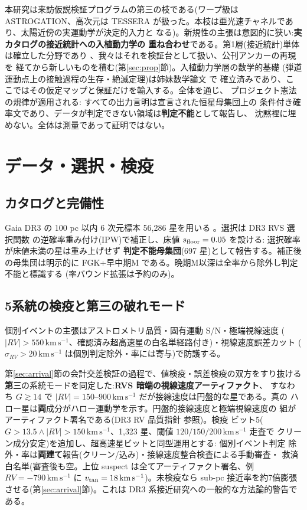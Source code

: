 \documentclass[11pt]{article}
\newcommand{\kms}{\,\mathrm{km\,s^{-1}}}
\begin{document}
本研究は来訪仮説検証プログラムの第三の枝である(ワープ級は ASTROGATION、高次元は
TESSERA が扱った。本枝は亜光速チャネルであり、太陽近傍の実運動学が決定的入力と
なる)。新規性の主張は意図的に狭い:\textbf{実カタログの接近統計への入植動力学の
重ね合わせ}である。第1層(接近統計)単体は確立した分野であり
\cite{bj18,bj22,gs01,fp26}、我々はそれを検証台として扱い、公刊アンカーの再現を
経てから新しいものを積む(第\ref{sec:prop}節)。入植動力学層の数学的基礎
(弾道運動点上の接触過程の生存・絶滅定理)は姉妹数学論文 \cite{wakemath} で
確立済みであり、ここではその仮定マップと保証だけを輸入する。全体を通じ、
プロジェクト憲法の規律が適用される: すべての出力言明は宣言された恒星母集団上の
条件付き確率文であり、データが判定できない領域は\textbf{判定不能}として報告し、
沈黙裡に埋めない。全体は測量であって証明ではない。

\section{データ・選択・検疫}\label{sec:data}

\subsection{カタログと完備性}
Gaia DR3 の 100 pc 以内 6 次元標本 56{,}286 星を用いる \cite{gaiadr3}。選択は
DR3 RVS 選択関数 \cite{gaiaunlimited} の逆確率重み付け(IPW)で補正し、床値
$s_{\rm floor}=0.05$ を設ける: 選択確率が床値未満の星は重み上げせず
\textbf{判定不能母集団}(697 星)として報告する。補正後の母集団は明示的に
FGK+早中期M である。晩期M以深は全率から除外し判定不能と標識する
(率バウンド拡張は予約のみ)。

\subsection{5系統の検疫と第三の破れモード}\label{sec:bit5}
個別イベントの主張はアストロメトリ品質・固有運動 S/N・極端視線速度
($|RV|>550\kms$、確認済み超高速星の白名単経路付き)・視線速度誤差カット
($\sigma_{RV}>20\kms$ は個別判定除外・率には寄与)で防護する。

第\ref{sec:arrival}節の会計交差検証の過程で、値検疫・誤差検疫の双方をすり抜ける
\textbf{第三}の系統モードを同定した:\textbf{RVS 暗端の視線速度アーティファクト}、
すなわち $G\gtrsim14$ で $|RV|=150$--$900\kms$ だが接線速度は円盤的な星である。真の
ハロー星は\textbf{両}成分がハロー運動学を示す。円盤的接線速度と極端視線速度の
組がアーティファクト署名である(DR3 RV 品質指針 \cite{katz23} 参照)。検疫
ビット5($G>13.5\wedge|RV|>150\kms$、1{,}323 星、閾値 $120/150/200\kms$ 走査で
クリーン成分安定)を追加し、超高速星ビットと同型運用とする: 個別イベント判定
除外・率は\textbf{両建て}報告(クリーン/込み)・接線速度整合検査による手動審査・
救済白名単(審査後も空。上位 suspect は全てアーティファクト署名、例
$RV=-790\kms$ に $v_{\rm tan}=18\kms$)。未検疫なら sub-pc 接近率を約7倍膨張
させる(第\ref{sec:arrival}節)。これは DR3 系接近研究への一般的な方法論的警告である。
\end{document}

